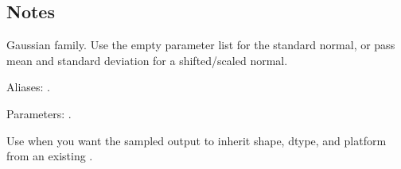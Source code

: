 \documentclass[letterpaper,10pt,english]{sphinxmanual}
\begin{document}
\begin{sphinxVerbatim}[commandchars=\\\{\}]
\end{sphinxVerbatim}


\subsection{Notes}
\label{\detokenize{distribution_catalog:notes}}
\sphinxAtStartPar
Gaussian family. Use the empty parameter list for the standard normal, or pass mean and standard deviation for a shifted/scaled normal.

\sphinxAtStartPar
Aliases: .

\sphinxAtStartPar
Parameters: .

\sphinxAtStartPar
Use  when you want the sampled output to inherit shape, dtype, and platform from an existing .
\end{document}
